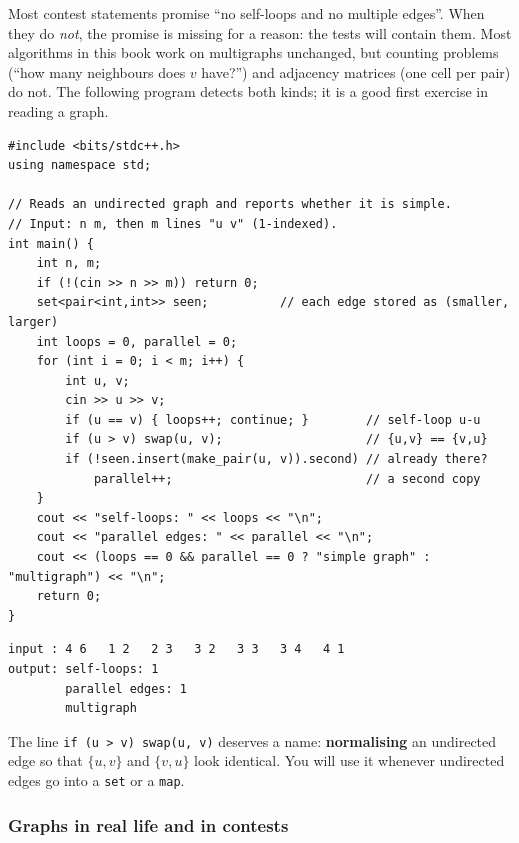 Most contest statements promise ``no self-loops and no multiple edges''. When they do \emph{not}, the promise is missing for a reason: the tests will contain them. Most algorithms in this book work on multigraphs unchanged, but counting problems (``how many neighbours does $v$ have?'') and adjacency matrices (one cell per pair) do not. The following program detects both kinds; it is a good first exercise in reading a graph.

\begin{lstlisting}[style=cpp]
#include <bits/stdc++.h>
using namespace std;

// Reads an undirected graph and reports whether it is simple.
// Input: n m, then m lines "u v" (1-indexed).
int main() {
    int n, m;
    if (!(cin >> n >> m)) return 0;
    set<pair<int,int>> seen;          // each edge stored as (smaller, larger)
    int loops = 0, parallel = 0;
    for (int i = 0; i < m; i++) {
        int u, v;
        cin >> u >> v;
        if (u == v) { loops++; continue; }        // self-loop u-u
        if (u > v) swap(u, v);                    // {u,v} == {v,u}
        if (!seen.insert(make_pair(u, v)).second) // already there?
            parallel++;                           // a second copy
    }
    cout << "self-loops: " << loops << "\n";
    cout << "parallel edges: " << parallel << "\n";
    cout << (loops == 0 && parallel == 0 ? "simple graph" : "multigraph") << "\n";
    return 0;
}
\end{lstlisting}

\begin{lstlisting}[style=trace]
input : 4 6   1 2   2 3   3 2   3 3   3 4   4 1
output: self-loops: 1
        parallel edges: 1
        multigraph
\end{lstlisting}

The line \texttt{if (u > v) swap(u, v)} deserves a name: \textbf{normalising} an undirected edge so that $\{u,v\}$ and $\{v,u\}$ look identical. You will use it whenever undirected edges go into a \texttt{set} or a \texttt{map}.

\subsubsection*{Graphs in real life and in contests}

